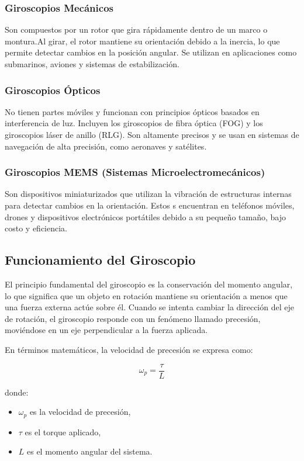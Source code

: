 \documentclass{article}
\begin{document}
	\subsubsection{Giroscopios Mecánicos}
		Son compuestos por un rotor que gira rápidamente dentro de un marco o montura.Al girar, el rotor mantiene su orientación debido a la inercia, lo que permite detectar cambios en la posición angular. Se utilizan en aplicaciones como submarinos, aviones y sistemas de estabilización.
	
	
	\subsubsection{Giroscopios Ópticos}

		No tienen partes móviles y funcionan con principios ópticos basados en interferencia de luz. Incluyen los giroscopios de fibra óptica (FOG) y los giroscopios láser de anillo (RLG). Son altamente precisos y se usan en sistemas de navegación de alta precisión, como aeronaves y satélites.

	
	\subsubsection{Giroscopios MEMS (Sistemas Microelectromecánicos)}

		Son dispositivos miniaturizados que utilizan la vibración de estructuras internas para detectar cambios en la orientación. Estos s encuentran en teléfonos móviles, drones y dispositivos electrónicos portátiles debido a su pequeño tamaño, bajo costo y eficiencia.

	
	\subsection{Funcionamiento del Giroscopio}
	El principio fundamental del giroscopio es la conservación del momento angular, lo que significa que un objeto en rotación mantiene su orientación a menos que una fuerza externa actúe sobre él. Cuando se intenta cambiar la dirección del eje de rotación, el giroscopio responde con un fenómeno llamado precesión, moviéndose en un eje perpendicular a la fuerza aplicada.
	
	En términos matemáticos, la velocidad de precesión se expresa como:
	
	\begin{equation}
		\omega_p = \frac{\tau}{L}
	\end{equation}
	
	donde:
	\begin{itemize}
		\item $\omega_p$ es la velocidad de precesión,
		\item $\tau$ es el torque aplicado,
		\item $L$ es el momento angular del sistema.
	\end{itemize}
	
\end{document}

